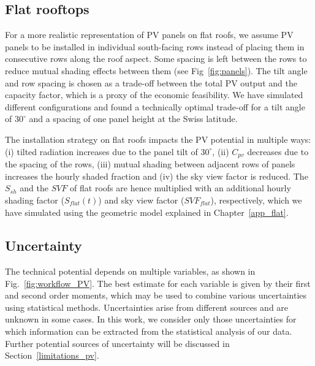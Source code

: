 
\subsection{Flat rooftops}
\label{flat}

For a more realistic representation of PV panels on flat roofs, we assume PV panels to be installed in individual south-facing rows instead of placing them in consecutive rows along the roof aspect. Some spacing is left between the rows to reduce mutual shading effects between them (see Fig~\ref{fig:panels}).
The tilt angle and row spacing is chosen as a trade-off between the total PV output and the capacity factor, which is a proxy of the economic feasibility.
We have simulated different configurations and found a technically optimal trade-off for a tilt angle of $30^\circ$ and a spacing of one panel height at the Swiss latitude.

The installation strategy on flat roofs impacts the PV potential in multiple ways: (i) tilted radiation increases due to the panel tilt of $30^\circ$, (ii) $C_{\mathit{pv}}$ decreases due to the spacing of the rows, (iii) mutual shading between adjacent rows of panels increases the hourly shaded fraction and (iv) the sky view factor is reduced. The $S_{sh}$ and the $\mathit{SVF}$ of flat roofs are hence multiplied with an additional hourly shading factor ($S_{\mathit{flat}}(t)$) and sky view factor ($\mathit{SVF}_{\mathit{flat}}$), respectively, which we have simulated using the geometric model explained in Chapter~\ref{app_flat}. 


\subsection{Uncertainty}
\label{unc}

The technical potential depends on multiple variables, as shown in Fig.~\ref{fig:workflow_PV}. 
The best estimate for each variable is given by their first and second order moments, which may be used to combine various uncertainties using statistical methods.
%
Uncertainties arise from different sources and are unknown in some cases. 
In this work, we consider only those uncertainties for which information can be extracted from the statistical analysis of our data. Further potential sources of uncertainty will be discussed in Section~\ref{limitations_pv}.


